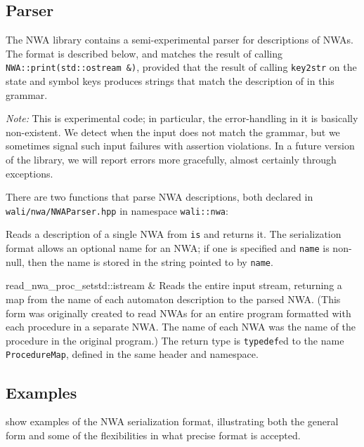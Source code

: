 \subsection{Parser}
\label{Se:parser}

The NWA library contains a semi-experimental parser for descriptions of
NWAs. The format is described below, and matches the result of calling
\texttt{NWA::print(std::ostream \&)}, provided that the result of
calling \texttt{key2str} on the state and symbol keys produces strings
that match the description of  in this grammar.

\emph{Note:} This is experimental code; in particular, the
error-handling in it is basically non-existent. We detect when the
input does not match the grammar, but we sometimes signal such input failures
with assertion violations. In a future version of the library, we will
report errors more gracefully, almost certainly through exceptions.

There are two functions that parse NWA descriptions, both declared in
\texttt{wali/nwa/NWAParser.hpp} in namespace \texttt{wali::nwa}:
\begin{functionlist}
  Reads a description of a single NWA from \texttt{is} and
  returns it. The serialization format allows an optional name for an NWA; if
  one is specified and \texttt{name} is non-null, then the name is stored in
  the string pointed to by \texttt{name}.

                   {read\_nwa\_proc\_set}{std::istream \&}{}
  Reads the entire input stream,
  returning a map from the name of each automaton description to the parsed
  NWA. (This form was originally created to read NWAs for an entire program
  formatted with each procedure in a separate NWA. The name of each NWA was
  the name of the procedure in the original program.) The return type
  is \texttt{typedef}ed to the name \texttt{ProcedureMap},
  defined in the same header and namespace.
\end{functionlist}


\subsection{Examples}

 show examples of the NWA serialization format, illustrating
both the general form and some of the flexibilities in what precise
format is accepted.

